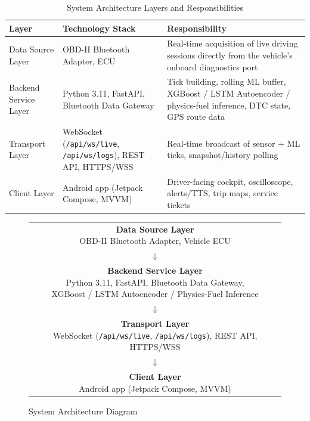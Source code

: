 \documentclass[10pt,a4paper]{report}
\begin{document}
\begin{table}[H]
\centering
\renewcommand{\arraystretch}{1.3}
\begin{tabular}{|p{3cm}|p{4cm}|p{6cm}|}
\hline
\textbf{Layer} & \textbf{Technology Stack} & \textbf{Responsibility} \\
\hline

Data Source Layer & OBD-II Bluetooth Adapter, ECU & Real-time acquisition of live driving sessions directly from the vehicle's onboard diagnostics port \\
\hline

Backend Service Layer & Python 3.11, FastAPI, Bluetooth Data Gateway & Tick building, rolling ML buffer, XGBoost / LSTM Autoencoder / physics-fuel inference, DTC state, GPS route data \\
\hline

Transport Layer & WebSocket (\texttt{/api/ws/live}, \texttt{/api/ws/logs}), REST API, HTTPS/WSS & Real-time broadcast of sensor + ML ticks, snapshot/history polling \\
\hline

Client Layer & Android app (Jetpack Compose, MVVM) & Driver-facing cockpit, oscilloscope, alerts/TTS, trip maps, service tickets \\
\hline

\end{tabular}
\caption{System Architecture Layers and Responsibilities}
\label{tab:system_architecture}
\end{table}
\begin{figure}[H]
\centering
\renewcommand{\arraystretch}{1.0}
\begin{tabular}{c}
  \fbox{\parbox{9cm}{\centering\textbf{Data Source Layer}\\[3pt]
        OBD-II Bluetooth Adapter, Vehicle ECU}}\\[6pt]
  {\Large$\Downarrow$}\\[6pt]
  \fbox{\parbox{9cm}{\centering\textbf{Backend Service Layer}\\[3pt]
        Python 3.11, FastAPI, Bluetooth Data Gateway,\\
        XGBoost / LSTM Autoencoder / Physics-Fuel Inference}}\\[6pt]
  {\Large$\Downarrow$}\\[6pt]
  \fbox{\parbox{9cm}{\centering\textbf{Transport Layer}\\[3pt]
        WebSocket (\texttt{/api/ws/live}, \texttt{/api/ws/logs}), REST API, HTTPS/WSS}}\\[6pt]
  {\Large$\Downarrow$}\\[6pt]
  \fbox{\parbox{9cm}{\centering\textbf{Client Layer}\\[3pt]
        Android app (Jetpack Compose, MVVM)}}\\
\end{tabular}
\caption{System Architecture Diagram}
\label{arch}
\end{figure}
\end{document}
